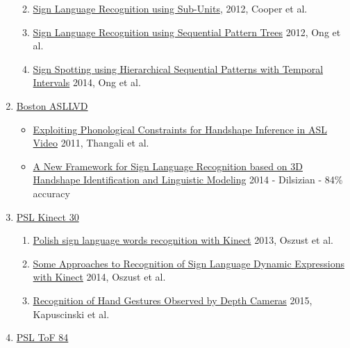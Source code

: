 \begin{enumerate}
  \begin{enumerate}
  \def\labelenumii{\arabic{enumii}.}
  \itemsep1pt\parskip0pt
  \item
    \href{http://jmlr.csail.mit.edu/papers/volume13/cooper12a/cooper12a.pdf}{Sign
    Language Recognition using Sub-Units}, 2012, Cooper et al.
  \item
    \href{https://pdfs.semanticscholar.org/e8a1/84e76d6476ecc27857b1c1b280af5628d0ae.pdf}{Sign
    Language Recognition using Sequential Pattern Trees} 2012, Ong et
    al.
  \item
    \href{http://www.cv-foundation.org/openaccess/content_cvpr_2014/papers/Ong_Sign_Spotting_using_2014_CVPR_paper.pdf}{Sign
    Spotting using Hierarchical Sequential Patterns with Temporal
    Intervals} 2014, Ong et al.
  \end{enumerate}
\item
  \href{http://www.bu.edu/av/asllrp/dai-asllvd.html}{Boston ASLLVD}

  \begin{itemize}
  \itemsep1pt\parskip0pt
  \item
    \href{http://www.bu.edu/asllrp/1826-CVPR_2011.pdf}{Exploiting
    Phonological Constraints for Handshape Inference in ASL Video} 2011,
    Thangali et al.
  \item
    \href{http://www.lrec-conf.org/proceedings/lrec2014/pdf/1138_Paper.pdf}{A
    New Framework for Sign Language Recognition based on 3D Handshape
    Identification and Linguistic Modeling} 2014 - Dilsizian - 84\%
    accuracy
  \end{itemize}
\item
  \href{http://vision.kia.prz.edu.pl/dynamickinect.php}{PSL Kinect 30}

  \begin{enumerate}
  \def\labelenumii{\arabic{enumii}.}
  \itemsep1pt\parskip0pt
  \item
    \href{http://ieeexplore.ieee.org/xpl/login.jsp?tp=\&arnumber=6577826\&url=http\%3A\%2F\%2Fieeexplore.ieee.org\%2Fxpls\%2Fabs_all.jsp\%3Farnumber\%3D6577826}{Polish
    sign language words recognition with Kinect} 2013, Oszust et al.
  \item
    \href{http://link.springer.com/chapter/10.1007\%2F978-3-319-08491-6_7}{Some
    Approaches to Recognition of Sign Language Dynamic Expressions with
    Kinect} 2014, Oszust et al.
  \item
    \href{http://cdn.intechopen.com/pdfs-wm/48352.pdf}{Recognition of
    Hand Gestures Observed by Depth Cameras} 2015, Kapuscinski et al.
  \end{enumerate}
\item
  \href{http://vision.kia.prz.edu.pl/dynamictof.php}{PSL ToF 84}


\end{enumerate}

